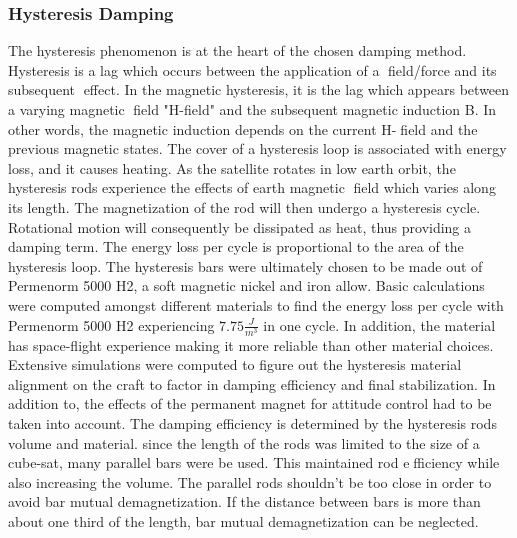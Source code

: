 \documentclass[12pt]{article}
\begin{document}
\subsubsection{Hysteresis Damping}
The hysteresis phenomenon is at the heart of the chosen damping method. Hysteresis is a lag which occurs between the application of a field/force and its subsequent effect. In the magnetic hysteresis, it is the lag which appears between a varying magnetic field "H-field" and the subsequent magnetic induction B. In other words, the magnetic induction depends on the current H-field and the previous magnetic states. The cover of a hysteresis loop is associated with energy loss, and it causes heating. As the satellite rotates in low earth orbit, the hysteresis rods experience the effects of earth magnetic field which varies along its length. The magnetization of the rod will then undergo a hysteresis cycle. Rotational motion will consequently be dissipated as heat, thus providing a  damping term. The energy loss per cycle is proportional to the area of the hysteresis loop.
\newline \newline
The hysteresis bars were ultimately chosen to be made out of Permenorm 5000 H2, a soft magnetic nickel and iron allow. Basic calculations were computed amongst different materials to find the energy loss per cycle with Permenorm 5000 H2 experiencing $7.75 \frac{J}{m^3}$ in one cycle. In addition, the material has space-flight experience making it more reliable than other material choices. 
\newline \newline
Extensive simulations were computed to figure out the hysteresis material alignment on the craft to factor in damping efficiency and final stabilization. In addition to, the effects of the permanent magnet for attitude control had to be taken into account. The damping efficiency is determined by the hysteresis rods volume and material. since the length of the rods was limited to the size of a cube-sat, many parallel bars were be used. This maintained rod efficiency while also increasing the volume. The parallel rods shouldn't be too close in order to avoid bar mutual demagnetization. If the distance between bars is more than about one third of the length, bar mutual demagnetization can be neglected.
\end{document}
